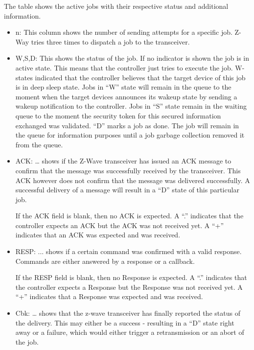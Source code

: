 The table shows the active jobs with their respective status and additional information.
\begin{itemize}

\item n: This column shows the number of sending attempts for a specific job.  Z-Way tries three times to dispatch a job to the transceiver.

\item W,S,D: This shows the status of the job. If no indicator is shown the job is in active state. This means that the controller just tries to execute the job. W- states indicated that the controller believes that the target device of this job is in deep sleep state. Jobs in “W” state will remain in the queue to the moment when the target devices announces its wakeup state by sending a wakeup notification to the controller. Jobs in “S” state remain in the waiting queue to the moment the security token for this secured information exchanged was validated. 
“D” marks a job as done. The job will remain in the queue for information purposes until a job garbage collection removed it from the queue.

\item ACK: … shows if the Z-Wave transceiver has issued an ACK message to confirm that the message was successfully received by the transceiver. This ACK however does not confirm that the message was delivered successfully. A successful delivery of a message will result in a “D” state of this particular job. 

If the ACK field is blank, then no ACK is expected. A “.” indicates that the controller expects an ACK but the ACK was not received yet. A “+” indicates that an ACK was expected and was received.

\item RESP: ... shows if a certain command was confirmed with a valid response. Commands are either answered by a response or a callback.

If the RESP field is blank, then no Response is expected. A “.” indicates that the controller expects a Response but the Response was not received yet. A “+” indicates that a Response was expected and was received.

\item Cbk: … shows that the z-wave transceiver has finally reported the status of the delivery. This may either be a success  - resulting in a “D” state right away or a failure, which would either trigger a retransmission or an abort of the job.


\end{itemize}
